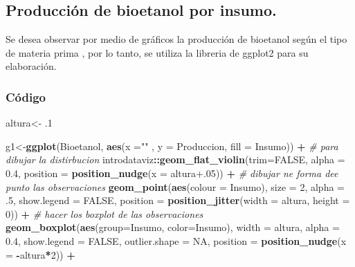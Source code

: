 \documentclass[
]{article}
\newenvironment{Shaded}{\begin{snugshade}}{\end{snugshade}}
\newcommand{\AttributeTok}[1]{\textcolor[rgb]{0.13,0.29,0.53}{#1}}
\newcommand{\CommentTok}[1]{\textcolor[rgb]{0.56,0.35,0.01}{\textit{#1}}}
\newcommand{\ConstantTok}[1]{\textcolor[rgb]{0.56,0.35,0.01}{#1}}
\newcommand{\DecValTok}[1]{\textcolor[rgb]{0.00,0.00,0.81}{#1}}
\newcommand{\FloatTok}[1]{\textcolor[rgb]{0.00,0.00,0.81}{#1}}
\newcommand{\FunctionTok}[1]{\textcolor[rgb]{0.13,0.29,0.53}{\textbf{#1}}}
\newcommand{\NormalTok}[1]{#1}
\newcommand{\OtherTok}[1]{\textcolor[rgb]{0.56,0.35,0.01}{#1}}
\newcommand{\SpecialCharTok}[1]{\textcolor[rgb]{0.81,0.36,0.00}{\textbf{#1}}}
\newcommand{\StringTok}[1]{\textcolor[rgb]{0.31,0.60,0.02}{#1}}
\begin{document}
\subsection{Producción de bioetanol por
insumo.}\label{producciuxf3n-de-bioetanol-por-insumo.}

Se desea observar por medio de gráficos la producción de bioetanol según
el tipo de materia prima , por lo tanto, se utiliza la libreria de
ggplot2 para su elaboración.

\subsubsection{Código}\label{cuxf3digo}

\begin{Shaded}
\begin{Highlighting}[]
\NormalTok{altura}\OtherTok{\textless{}{-}}\NormalTok{ .}\DecValTok{1}

\NormalTok{ g1}\OtherTok{\textless{}{-}}\FunctionTok{ggplot}\NormalTok{(Bioetanol,}
       \FunctionTok{aes}\NormalTok{(}\AttributeTok{x =}\StringTok{""}\NormalTok{ ,}
           \AttributeTok{y =}\NormalTok{ Produccion,}
           \AttributeTok{fill =}\NormalTok{ Insumo)) }\SpecialCharTok{+}
  \CommentTok{\# para dibujar la distirbucion }
\NormalTok{  introdataviz}\SpecialCharTok{::}\FunctionTok{geom\_flat\_violin}\NormalTok{(}\AttributeTok{trim=}\ConstantTok{FALSE}\NormalTok{,}
                                 \AttributeTok{alpha =} \FloatTok{0.4}\NormalTok{,}
                                 \AttributeTok{position =} \FunctionTok{position\_nudge}\NormalTok{(}\AttributeTok{x =}\NormalTok{ altura}\FloatTok{+.05}\NormalTok{)) }\SpecialCharTok{+}
  \CommentTok{\# dibujar ne forma dee punto las observaciones }
  \FunctionTok{geom\_point}\NormalTok{(}\FunctionTok{aes}\NormalTok{(}\AttributeTok{colour =}\NormalTok{ Insumo), }
             \AttributeTok{size =} \DecValTok{2}\NormalTok{,}
             \AttributeTok{alpha =}\NormalTok{ .}\DecValTok{5}\NormalTok{,}
             \AttributeTok{show.legend =} \ConstantTok{FALSE}\NormalTok{, }
             \AttributeTok{position =} \FunctionTok{position\_jitter}\NormalTok{(}\AttributeTok{width =}\NormalTok{ altura,}
                                        \AttributeTok{height =} \DecValTok{0}\NormalTok{)) }\SpecialCharTok{+}
  \CommentTok{\# hacer los boxplot de las observaciones }
  \FunctionTok{geom\_boxplot}\NormalTok{(}\FunctionTok{aes}\NormalTok{(}\AttributeTok{group=}\NormalTok{Insumo, }\AttributeTok{color=}\NormalTok{Insumo),}
               \AttributeTok{width =}\NormalTok{ altura,}
               \AttributeTok{alpha =} \FloatTok{0.4}\NormalTok{, }
               \AttributeTok{show.legend =} \ConstantTok{FALSE}\NormalTok{, }
               \AttributeTok{outlier.shape =} \ConstantTok{NA}\NormalTok{,}
               \AttributeTok{position =} \FunctionTok{position\_nudge}\NormalTok{(}\AttributeTok{x =} \SpecialCharTok{{-}}\NormalTok{altura}\SpecialCharTok{*}\DecValTok{2}\NormalTok{)) }\SpecialCharTok{+}
   

\end{Highlighting}
\end{Shaded}
\end{document}

